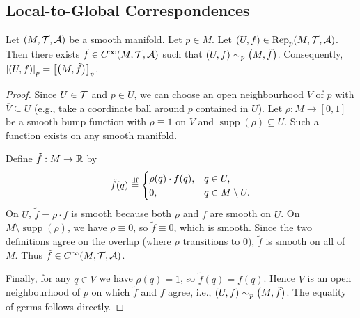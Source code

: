 \documentclass[11pt,reqno]{amsart}
\newcommand{\Rep}{\mathrm{Rep}}
\begin{document}
\subsection{Local-to-Global Correspondences}
\begin{lemma}\label{lem:germ-extension}
Let $(M,\mathcal{T},\mathcal{A})$ be a smooth manifold. Let $p\in M$.
Let $(U,f)\in\Rep_p(M,\T,\A)$.
Then there exists $\tilde f\in C^\infty(M,\mathcal{T},\mathcal{A})$ such that
$(U,f)\sim_p\Br{M,\tilde f}$. Consequently,
${\SqBr{(U,f)}}_p=\SqBr{\Br{M,\tilde f}}_p$.
\end{lemma}
\begin{proof}
Since $U\in\mathcal{T}$ and $p\in U$, we can choose an open neighbourhood $V$ of $p$
with $\overline V\subseteq U$ (e.g., take a coordinate ball around $p$
contained in $U$).  Let $\rho:M\to[0,1]$ be a smooth bump function with
$\rho\equiv 1$ on $V$ and $\operatorname{supp}(\rho)\subseteq U$.
Such a function exists on any smooth manifold.

Define $\tilde f:M\to\mathbb{R}$ by
\[
\tilde f(q)\stackrel{\mathrm{df}}{=}\begin{cases}
\rho(q)\cdot f(q),&q\in U,\\
0,&q\in M\setminus U.
\end{cases}
\]
On $U$, $\tilde f=\rho\cdot f$ is smooth because both $\rho$ and $f$ are
smooth on $U$.  On $M\setminus\operatorname{supp}(\rho)$, we have $\rho\equiv 0$, so
$\tilde f\equiv 0$, which is smooth.  Since the two definitions agree on the
overlap (where $\rho$ transitions to $0$), $\tilde f$ is smooth on all of
$M$.  Thus $\tilde f\in C^\infty(M,\mathcal{T},\mathcal{A})$.

Finally, for any $q\in V$ we have $\rho(q)=1$, so
$\tilde f(q)=f(q)$.  Hence $V$ is an open neighbourhood of $p$ on which
$\tilde f$ and $f$ agree, i.e., $(U,f)\sim_p\Br{M,\tilde f}$.
The equality of germs follows directly.
\end{proof}
\end{document}
